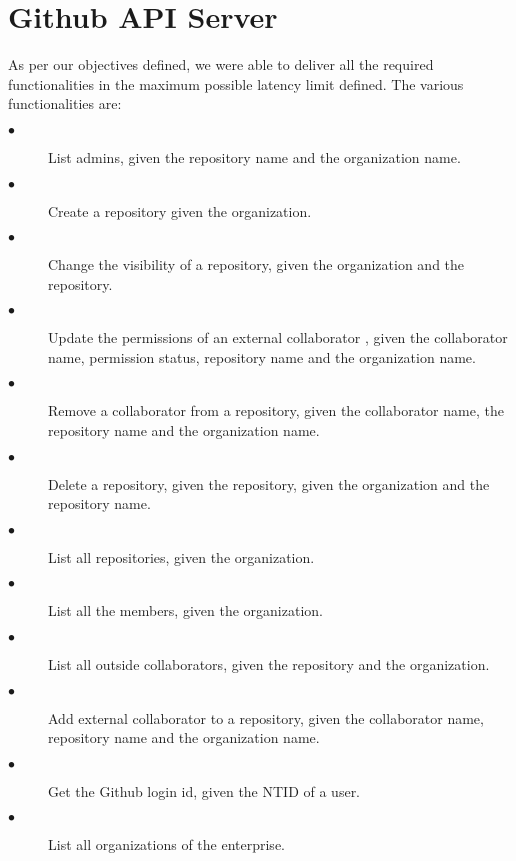 \section{Github API Server}
As per our objectives defined, we were able to deliver all the required functionalities in the maximum possible latency limit defined. The various functionalities are:
\begin{description}

\item[$\bullet$] List admins, given the repository name and the organization name.

\item[$\bullet$] Create a repository given the organization.

\item[$\bullet$] Change the visibility of a repository, given the organization and the repository.

\item[$\bullet$] Update the permissions of an external collaborator , given the collaborator name, permission status, repository name and the organization name.

\item[$\bullet$] Remove a collaborator from a repository, given the collaborator name, the repository name and the organization name.

\item[$\bullet$] Delete a repository, given the repository, given the organization and the repository name.

\item[$\bullet$] List all repositories, given the organization.

\item[$\bullet$] List all the members, given the organization.

\item[$\bullet$] List all outside collaborators, given the repository and the organization.

\item[$\bullet$] Add external collaborator to a repository, given the collaborator name, repository name and the organization name.

\item[$\bullet$] Get the Github login id, given the NTID of a user.

\item[$\bullet$] List all organizations of the enterprise.

\end{description}

